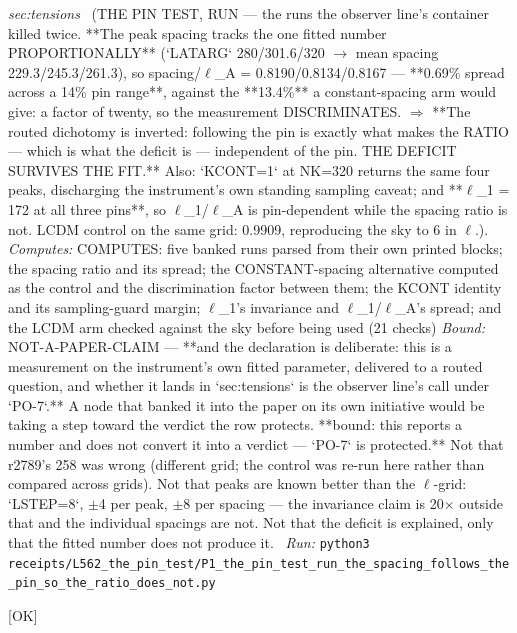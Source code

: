 \begin{description}
\textit{sec:tensions} \ (THE PIN TEST, RUN --- the runs the observer line's container killed twice. **The peak spacing tracks the one fitted number PROPORTIONALLY** (`LATARG` 280/301.6/320 \ensuremath{\to} mean spacing 229.3/245.3/261.3), so spacing/\ensuremath{\ell}\_A = 0.8190/0.8134/0.8167 --- **0.69\% spread across a 14\% pin range**, against the **13.4\%** a constant-spacing arm would give: a factor of twenty, so the measurement DISCRIMINATES. \ensuremath{\Rightarrow} **The routed dichotomy is inverted: following the pin is exactly what makes the RATIO --- which is what the deficit is --- independent of the pin. THE DEFICIT SURVIVES THE FIT.** Also: `KCONT=1` at NK=320 returns the same four peaks, discharging the instrument's own standing sampling caveat; and **\ensuremath{\ell}\_1 = 172 at all three pins**, so \ensuremath{\ell}\_1/\ensuremath{\ell}\_A is pin-dependent while the spacing ratio is not. LCDM control on the same grid: 0.9909, reproducing the sky to 6 in \ensuremath{\ell}.). 
\emph{Computes:} COMPUTES: five banked runs parsed from their own printed blocks; the spacing ratio and its spread; the CONSTANT-spacing alternative computed as the control and the discrimination factor between them; the KCONT identity and its sampling-guard margin; \ensuremath{\ell}\_1's invariance and \ensuremath{\ell}\_1/\ensuremath{\ell}\_A's spread; and the LCDM arm checked against the sky before being used (21 checks)
 \emph{Bound:} NOT-A-PAPER-CLAIM --- **and the declaration is deliberate: this is a measurement on the instrument's own fitted parameter, delivered to a routed question, and whether it lands in `sec:tensions` is the observer line's call under `PO-7`.** A node that banked it into the paper on its own initiative would be taking a step toward the verdict the row protects. **bound: this reports a number and does not convert it into a verdict --- `PO-7` is protected.** Not that r2789's 258 was wrong (different grid; the control was re-run here rather than compared across grids). Not that peaks are known better than the \ensuremath{\ell}-grid: `LSTEP=8`, \ensuremath{\pm}4 per peak, \ensuremath{\pm}8 per spacing --- the invariance claim is 20\ensuremath{\times} outside that and the individual spacings are not. Not that the deficit is explained, only that the fitted number does not produce it.
\ \emph{Run:} \texttt{python3 receipts/L562\_the\_pin\_test/P1\_the\_pin\_test\_run\_the\_spacing\_follows\_the\_pin\_so\_the\_ratio\_does\_not.py}
\item[\rcptlabel{P15_the_driving_is_bought_by_decay_during_oscillation}{P15R150}\textbf{P15R150}\quad\texttt{P15\_the\_driving\_is\_bought\_by\_decay\_during\_oscillation}]\hfill\textsf{[OK]}\\

\end{description}
